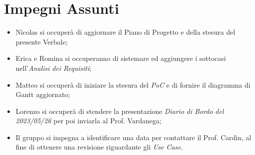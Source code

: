 \documentclass[a4paper, 12pt]{article}
\begin{document}
\section*{Impegni Assunti}
\begin{itemize}
    \item Nicolas si occuperà di aggiornare il Piano di Progetto e della stesura
    del presente Verbale;
    \item Erica e Romina si occuperanno di sistemare ed aggiungere i sottocasi
    nell'\textit{Analisi dei Requisiti};
    \item Matteo si occuperà di iniziare la stesura del \textit{PoC} e di
    fornire il diagramma di Gantt aggiornato;
    \item Lorenzo si occuperà di stendere la presentazione \textit{Diario di Bordo del 2023/05/26} per poi inviarla al Prof. Vardanega;
    \item Il gruppo si impegna a identificare una data per contattare il Prof.
    Cardin, al fine di ottenere una revisione riguardante gli \textit{Use Case}.
\end{itemize}
\end{document}
